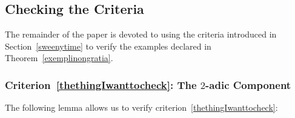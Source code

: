 \subsection{Checking the Criteria}\label{icheckthat}

The remainder of the paper is devoted to using the criteria introduced in Section~\ref{sweenytime} to verify the examples declared in Theorem~\ref{exemplinongratia}.



%

\subsubsection{Criterion~\eqref{thethingIwanttocheck}: The $2$-adic Component} \label{subsection:2-adic}

The following lemma allows us to verify criterion~\eqref{thethingIwanttocheck}:

